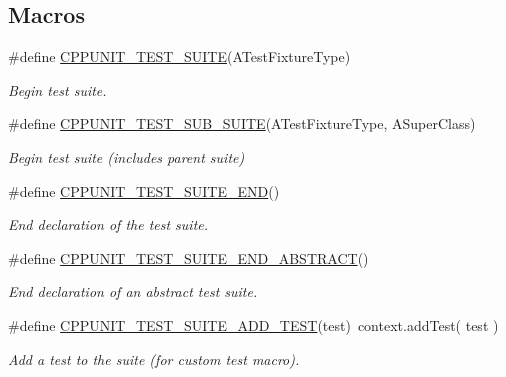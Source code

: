 \subsection*{Macros}
\begin{DoxyCompactItemize}
\item 
\#define \hyperlink{group___writing_test_fixture_gaef6ae7648fa961600921b6c004f39933}{C\+P\+P\+U\+N\+I\+T\+\_\+\+T\+E\+S\+T\+\_\+\+S\+U\+I\+TE}(A\+Test\+Fixture\+Type)                                                        
\begin{DoxyCompactList}\small\item\em Begin test suite. \end{DoxyCompactList}\item 
\#define \hyperlink{group___writing_test_fixture_gae19f30ade82172cf6c3ff297367a10c2}{C\+P\+P\+U\+N\+I\+T\+\_\+\+T\+E\+S\+T\+\_\+\+S\+U\+B\+\_\+\+S\+U\+I\+TE}(A\+Test\+Fixture\+Type,  A\+Super\+Class)
\begin{DoxyCompactList}\small\item\em Begin test suite (includes parent suite) \end{DoxyCompactList}\item 
\#define \hyperlink{group___writing_test_fixture_ga3b353d6e84f681ae85cced96dce0a4ae}{C\+P\+P\+U\+N\+I\+T\+\_\+\+T\+E\+S\+T\+\_\+\+S\+U\+I\+T\+E\+\_\+\+E\+ND}()                                                                                          
\begin{DoxyCompactList}\small\item\em End declaration of the test suite. \end{DoxyCompactList}\item 
\#define \hyperlink{group___writing_test_fixture_gac77c32dbef97af8cd6eec186bf2bbdbf}{C\+P\+P\+U\+N\+I\+T\+\_\+\+T\+E\+S\+T\+\_\+\+S\+U\+I\+T\+E\+\_\+\+E\+N\+D\+\_\+\+A\+B\+S\+T\+R\+A\+CT}()                                                                        
\begin{DoxyCompactList}\small\item\em End declaration of an abstract test suite. \end{DoxyCompactList}\item 
\#define \hyperlink{group___writing_test_fixture_gaace55a4a3a4f3e0cd219d38e98d4f48f}{C\+P\+P\+U\+N\+I\+T\+\_\+\+T\+E\+S\+T\+\_\+\+S\+U\+I\+T\+E\+\_\+\+A\+D\+D\+\_\+\+T\+E\+ST}(test)~context.\+add\+Test( test )
\begin{DoxyCompactList}\small\item\em Add a test to the suite (for custom test macro). \end{DoxyCompactList}\item 

\end{DoxyCompactItemize}
